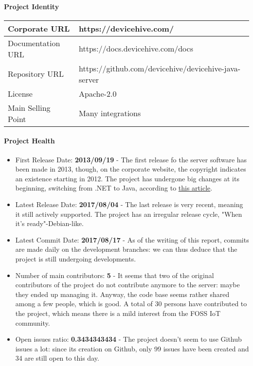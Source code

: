 \documentclass{article}
\begin{document}
\paragraph{Project Identity}

\begin{center}
\begin{tabular}{|l|l|}
\hline
Corporate URL & https://devicehive.com/ \\ \hline
Documentation URL & https://docs.devicehive.com/docs \\ \hline
Repository URL & https://github.com/devicehive/devicehive-java-server \\ \hline
License & Apache-2.0 \\ \hline
Main Selling Point & Many integrations \\ \hline
\end{tabular}
\end{center}

\paragraph{Project Health}

\begin{itemize}
\item First Release Date: \textbf{2013/09/19} - The first release fo the server software has been made in 2013, though, on the corporate website, the copyright indicates an existence starting in 2012. The project has undergone big changes at its beginning, switching from .NET to Java, according to \href{http://www.techrepublic.com/blog/tablets-in-the-enterprise/devicehive-an-open-source-m2m-development-platform/}{this article}.
\item Latest Release Date: \textbf{2017/08/04} - The last release is very recent, meaning it still actively supported. The project has an irregular release cycle, "When it's ready"-Debian-like.
\item Latest Commit Date: \textbf{2017/08/17} - As of the writing of this report, commits are made daily on the development branches: we can thus deduce that the project is still undergoing developments.
\item Number of main contributors: \textbf{5} - It seems that two of the original contributors of the project do not contribute anymore to the server: maybe they ended up managing it. Anyway, the code base seems rather shared among a few people, which is good. A total of 30 persons have contributed to the project, which means there is a mild interest from the FOSS IoT community.
\item Open issues ratio: \textbf{0.3434343434} - The project doesn't seem to use Github issues a lot: since its creation on Github, only 99 issues have been created and 34 are still open to this day.
\end{itemize}
\end{document}
